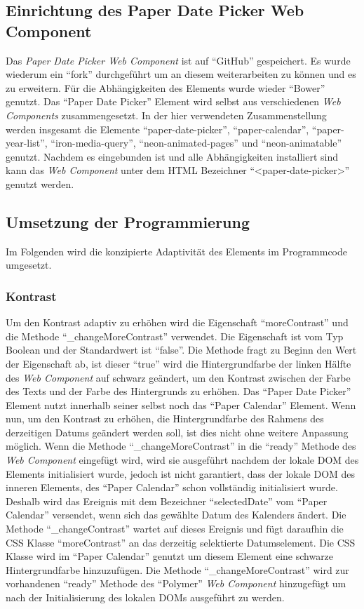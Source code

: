 \documentclass[12pt, paper=a4, bibtotoc, toc=listof, headsepline=true]{scrreprt}
\begin{document}
		\subsection{Einrichtung des Paper Date Picker Web Component}
		Das \emph{Paper Date Picker Web Component} ist auf \enquote{GitHub} gespeichert. Es wurde wiederum ein \enquote{fork} durchgeführt um an diesem weiterarbeiten zu können und es zu erweitern. Für die Abhängigkeiten des Elements wurde wieder \enquote{Bower} genutzt. Das \enquote{Paper Date Picker} Element wird selbst aus verschiedenen \emph{Web Components} zusammengesetzt. In der hier verwendeten Zusammenstellung werden insgesamt die Elemente \enquote{paper-date-picker}, \enquote{paper-calendar}, \enquote{paper-year-list}, \enquote{iron-media-query}, \enquote{neon-animated-pages} und \enquote{neon-animatable} genutzt. Nachdem es eingebunden ist und alle Abhängigkeiten installiert sind kann das \emph{Web Component} unter dem \ac{HTML} Bezeichner \enquote{<paper-date-picker>} genutzt werden.
		\subsection{Umsetzung der Programmierung}
		Im Folgenden wird die konzipierte Adaptivität des Elements im Programmcode umgesetzt. 
		\subsubsection{Kontrast}
		Um den Kontrast adaptiv zu erhöhen wird die Eigenschaft \enquote{moreContrast} und die Methode \enquote{\_changeMoreContrast} verwendet. Die Eigenschaft ist vom Typ Boolean und der Standardwert ist \enquote{false}. Die Methode fragt zu Beginn den Wert der Eigenschaft ab, ist dieser \enquote{true} wird die Hintergrundfarbe der linken Hälfte des \emph{Web Component} auf schwarz geändert, um den Kontrast zwischen der Farbe des Texts und der Farbe des Hintergrunds zu erhöhen. Das \enquote{Paper Date Picker} Element nutzt innerhalb seiner selbst noch das \enquote{Paper Calendar} Element. Wenn nun, um den Kontrast zu erhöhen, die Hintergrundfarbe des Rahmens des derzeitigen Datums geändert werden soll, ist dies nicht ohne weitere Anpassung möglich. Wenn die Methode \enquote{\_changeMoreContrast} in die \enquote{ready} Methode des \emph{Web Component} eingefügt wird, wird sie ausgeführt nachdem der lokale \ac{DOM} des Elements initialisiert wurde, jedoch ist nicht garantiert, dass der lokale \ac{DOM} des inneren Elements, des \enquote{Paper Calendar} schon vollständig initialisiert wurde. Deshalb wird das Ereignis mit dem Bezeichner \enquote{selectedDate} vom \enquote{Paper Calendar} versendet, wenn sich das gewählte Datum des Kalenders ändert. Die Methode \enquote{\_changeContrast} wartet auf dieses Ereignis und fügt daraufhin die \ac{CSS} Klasse \enquote{moreContrast} an das derzeitig selektierte Datumselement. Die \ac{CSS} Klasse wird im \enquote{Paper Calendar} genutzt um diesem Element eine schwarze Hintergrundfarbe hinzuzufügen. Die Methode \enquote{\_changeMoreContrast} wird zur vorhandenen \enquote{ready} Methode des \enquote{Polymer} \emph{Web Component} hinzugefügt um nach der Initialisierung des lokalen \ac{DOM}s ausgeführt zu werden.
\end{document}
